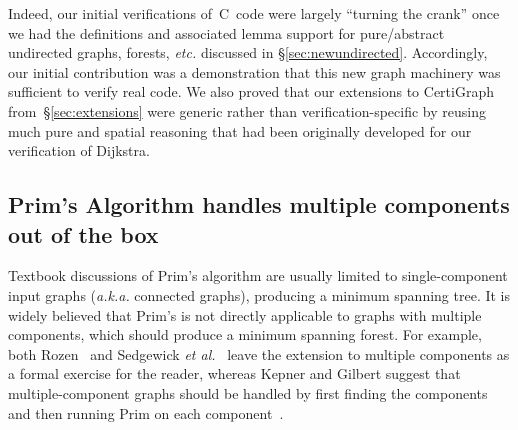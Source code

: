 Indeed, our initial verifications of~C~code were largely ``turning the crank'' once we had the definitions and associated lemma support for pure/abstract undirected graphs, forests, \emph{etc.} discussed in \S\ref{sec:newundirected}.  Accordingly, our initial contribution was a demonstration that this new graph machinery was sufficient to verify real code.  We also proved that our extensions to CertiGraph from~\S\ref{sec:extensions} were generic rather than verification-specific by reusing much pure and spatial reasoning that had been originally developed for our verification of Dijkstra.

\vspace*{-0.75em}
\subsection{Prim's Algorithm handles multiple components out of the box}
\label{sec:primforest}
\vspace*{-.5em}

Textbook discussions of Prim's algorithm are usually limited to single-component input graphs (\emph{a.k.a.} connected graphs), producing a minimum spanning tree.  It is widely believed that Prim's is not directly applicable to graphs with multiple components, which should produce a minimum spanning forest.  For example, both Rozen~\cite{rozen} and Sedgewick \emph{et al.}~\cite{sedgewick,DBLP:books/daglib/0029345} leave the extension to multiple components as a formal exercise for the reader, whereas Kepner and Gilbert suggest that multiple-component graphs should be handled by first finding the components and then running Prim on each component~\cite{kepnergilbert}.  %

